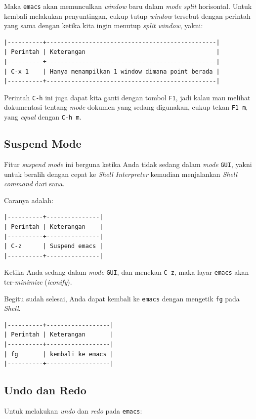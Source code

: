 \documentclass{article}
\begin{document}
Maka \verb=emacs= akan memunculkan \emph{window} baru dalam \emph{mode split}
horisontal. Untuk kembali melakukan penyuntingan, cukup tutup \emph{window}
tersebut dengan perintah yang sama dengan ketika kita ingin menutup 
\emph{split window}, yakni:

\begin{verbatim}
|----------+------------------------------------------------|
| Perintah | Keterangan                                     |
|----------+------------------------------------------------|
| C-x 1    | Hanya menampilkan 1 window dimana point berada |
|----------+------------------------------------------------|
\end{verbatim}

Perintah \verb=C-h= ini juga dapat kita ganti dengan tombol \verb=F1=, jadi 
kalau mau melihat dokumentasi tentang \emph{mode} dokumen yang sedang
digunakan, cukup tekan \verb=F1 m=, yang \emph{equal} dengan \verb=C-h m=.

\subsection{Suspend Mode}
Fitur \emph{suspend mode} ini berguna ketika Anda tidak sedang dalam 
\emph{mode} \verb=GUI=, yakni untuk beralih dengan cepat ke 
\emph{Shell Interpreter} kemudian menjalankan \emph{Shell command} dari sana.

Caranya adalah:

\begin{verbatim}
|----------+---------------|
| Perintah | Keterangan    |
|----------+---------------|
| C-z      | Suspend emacs |
|----------+---------------|
\end{verbatim}

Ketika Anda sedang dalam \emph{mode} \verb=GUI=, dan menekan \verb=C-z=, maka
layar \verb=emacs= akan ter-\emph{minimize} (\emph{iconify}).

Begitu sudah selesai, Anda dapat kembali ke \verb=emacs= dengan mengetik
\verb=fg= pada \emph{Shell}.

\begin{verbatim}
|----------+------------------|
| Perintah | Keterangan       |
|----------+------------------|
| fg       | kembali ke emacs |
|----------+------------------|
\end{verbatim}

\subsection{Undo dan Redo}
Untuk melakukan \emph{undo} dan \emph{redo} pada \verb=emacs=:
\end{document}
